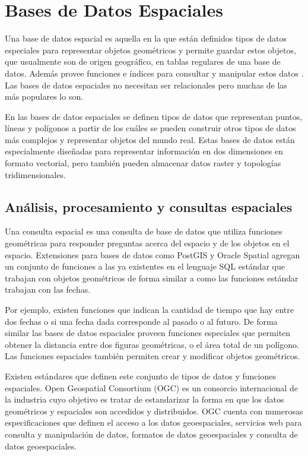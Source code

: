 \section{Bases de Datos Espaciales}

Una base de datos espacial es aquella en la que están definidos tipos de datos especiales para representar objetos geométricos y permite guardar estos objetos, que usualmente son de origen geográfico, en tablas regulares de una base de datos. Además provee funciones e índices para consultar y manipular estos datos \cite{obe2011postgis}. Las bases de datos espaciales no necesitan ser relacionales pero muchas de las más populares lo son.

En las bases de datos espaciales se definen tipos de datos que representan puntos, líneas y polígonos a partir de los cuáles se pueden construir otros tipos de datos más complejos y representar objetos del mundo real. Estas bases de datos están especialmente diseñadas para representar información en dos dimensiones en formato vectorial, pero también pueden almacenar datos raster y topologías tridimensionales.

\subsection{Análisis, procesamiento y consultas espaciales}

Una consulta espacial es una consulta de base de datos que utiliza funciones geométricas para responder preguntas acerca del espacio y de los objetos en el espacio. Extensiones para bases de datos como PostGIS y Oracle Spatial agregan un conjunto de funciones a las ya existentes en el lenguaje SQL estándar que trabajan con objetos geométricos de forma similar a como las funciones estándar trabajan con las fechas.

Por ejemplo, existen funciones que indican la cantidad de tiempo que hay entre dos fechas o si una fecha dada corresponde al pasado o al futuro. De forma similar las bases de datos espaciales proveen funciones especiales que permiten obtener la distancia entre dos figuras geométricas, o el área total de un polígono. Las funciones espaciales también permiten crear y modificar objetos geométricos.

Existen estándares que definen este conjunto de tipos de datos y funciones espaciales. Open Geospatial Consortium (OGC) es un consorcio internacional de la industria cuyo objetivo es tratar de estandarizar la forma en que los datos geométricos y espaciales son accedidos y distribuidos. OGC cuenta con numerosas especificaciones que definen el acceso a los datos geoespaciales, servicios web para consulta y manipulación de datos, formatos de datos geoespaciales y consulta de datos geoespaciales.

